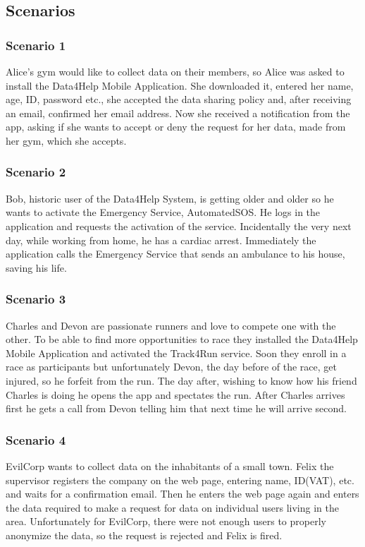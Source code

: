 \subsection{Scenarios}
\subsubsection{Scenario 1}
Alice's gym would like to collect data on their members, so Alice was asked to install the Data4Help Mobile Application. She downloaded it, entered her name, age, ID, password etc., she accepted the data sharing policy and, after receiving an email, confirmed her email address. Now she received a notification from the app, asking if she wants to accept or deny the request for her data, made from her gym, which she accepts.
\subsubsection{Scenario 2}
Bob, historic user of the Data4Help System, is getting older and older so he wants to activate the Emergency Service, AutomatedSOS. He logs in the application and requests the activation of the service.
Incidentally the very next day, while working from home, he has a cardiac arrest. Immediately the application calls the Emergency Service that sends an ambulance to his house, saving his life.
\subsubsection{Scenario 3}
Charles and Devon are passionate runners and love to compete one with the other. To be able to find more opportunities to race they installed the Data4Help Mobile Application and activated the Track4Run service. Soon they enroll in a race as participants but unfortunately Devon, the day before of the race, get injured, so he forfeit from the run. The day after, wishing to know how his friend Charles is doing he opens the app and spectates the run. After Charles arrives first he gets a call from Devon telling him that next time he will arrive second.
\subsubsection{Scenario 4}
EvilCorp wants to collect data on the inhabitants of a small town. Felix the supervisor registers the company on the web page, entering name, ID(VAT), etc. and waits for a confirmation email. Then he enters the web page again and enters the data required to make a request for data on individual users living in the area. Unfortunately for EvilCorp, there were not enough users to properly anonymize the data, so the request is rejected and Felix is fired.
